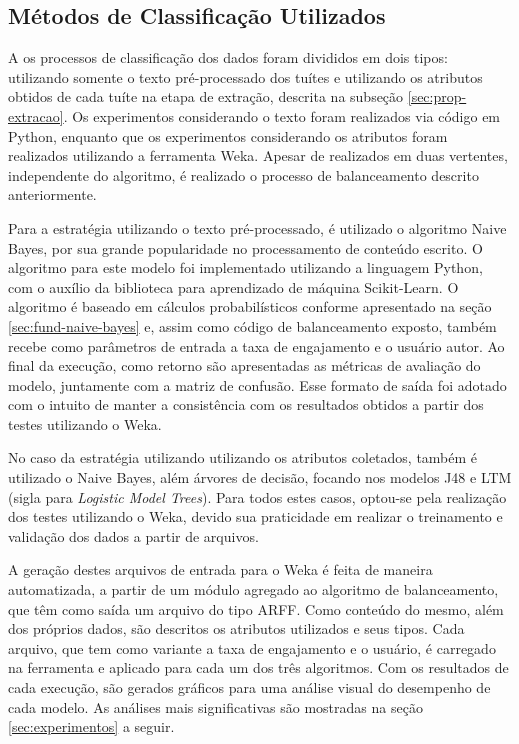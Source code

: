 \documentclass[oneside,openright,12pt]{ufsm_2015} %
\begin{document}

\subsection{Métodos de Classificação Utilizados}
\label{sec:prop-class-metodos}

    \par A os processos de classificação dos dados foram divididos em dois tipos: utilizando somente o texto pré-processado dos tuítes e utilizando os atributos obtidos de cada tuíte na etapa de extração, descrita na subseção \ref{sec:prop-extracao}. Os experimentos considerando o texto foram realizados via código em Python, enquanto que os experimentos considerando os atributos foram realizados utilizando a ferramenta Weka. Apesar de realizados em duas vertentes, independente do algoritmo, é realizado o processo de balanceamento descrito anteriormente.
    
    \par Para a estratégia utilizando o texto pré-processado, é utilizado o algoritmo Naive Bayes, por sua grande popularidade no processamento de conteúdo escrito. O algoritmo para este modelo foi implementado utilizando a linguagem Python, com o auxílio da biblioteca para aprendizado de máquina Scikit-Learn. O algoritmo é baseado em cálculos probabilísticos conforme apresentado na seção \ref{sec:fund-naive-bayes} e, assim como código de balanceamento exposto, também recebe como parâmetros de entrada a taxa de engajamento e o usuário autor. Ao final da execução, como retorno são apresentadas as métricas de avaliação do modelo, juntamente com a matriz de confusão. Esse formato de saída foi adotado com o intuito de manter a consistência com os resultados obtidos a partir dos testes utilizando o Weka.
    
    \par No caso da estratégia utilizando utilizando os atributos coletados, também é utilizado o Naive Bayes, além árvores de decisão, focando nos modelos J48 e LTM (sigla para \textit{Logistic Model Trees}). Para todos estes casos, optou-se pela realização dos testes utilizando o Weka, devido sua praticidade em realizar o treinamento e validação dos dados a partir de arquivos.
    
    \par A geração destes arquivos de entrada para o Weka é feita de maneira automatizada, a partir de um módulo agregado ao algoritmo de balanceamento, que têm como saída um arquivo do tipo ARFF. Como conteúdo do mesmo, além dos próprios dados, são descritos os atributos utilizados e seus tipos. Cada arquivo, que tem como variante a taxa de engajamento e o usuário, é carregado na ferramenta e aplicado para cada um dos três algoritmos. Com os resultados de cada execução, são gerados gráficos para uma análise visual do desempenho de cada modelo. As análises mais significativas são mostradas na seção \ref{sec:experimentos} a seguir.
\end{document}
